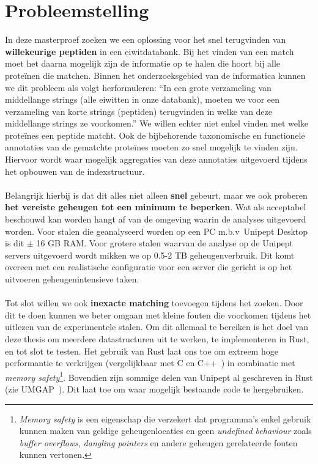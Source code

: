 \section{Probleemstelling}\label{sec:probleemstelling}
In deze masterproef zoeken we een oplossing voor het snel terugvinden van \textbf{willekeurige peptiden} in een eiwitdatabank.
Bij het vinden van een match moet het daarna mogelijk zijn de informatie op te halen die hoort bij alle proteïnen die matchen.
Binnen het onderzoeksgebied van de informatica kunnen we dit probleem als volgt herformuleren:
``In een grote verzameling van middellange strings (alle eiwitten in onze databank), moeten we voor een verzameling van korte strings (peptiden) terugvinden in welke van deze middellange strings ze voorkomen.''
We willen echter niet enkel vinden met welke proteïnes een peptide matcht.
Ook de bijbehorende taxonomische en functionele annotaties van de gematchte proteïnes moeten zo snel mogelijk te vinden zijn.
Hiervoor wordt waar mogelijk aggregaties van deze annotaties uitgevoerd tijdens het opbouwen van de indexstructuur.
\\ \\
Belangrijk hierbij is dat dit alles niet alleen \textbf{snel} gebeurt, maar we ook proberen \textbf{het vereiste geheugen tot een minimum te beperken}.
Wat als acceptabel beschouwd kan worden hangt af van de omgeving waarin de analyses uitgevoerd worden.
Voor stalen die geanalyseerd worden op een PC m.b.v~Unipept Desktop is dit $\pm$ 16 GB RAM\@.
Voor grotere stalen waarvan de analyse op de Unipept servers uitgevoerd wordt mikken we op 0.5-2 TB geheugenverbruik.
Dit komt overeen met een realistische configuratie voor een server die gericht is op het uitvoeren geheugenintensieve taken.
\\ \\
Tot slot willen we ook \textbf{inexacte matching} toevoegen tijdens het zoeken.
Door dit te doen kunnen we beter omgaan met kleine fouten die voorkomen tijdens het uitlezen van de experimentele stalen.
Om dit allemaal te bereiken is het doel van deze thesis om meerdere datastructuren uit te werken, te implementeren in Rust, en tot slot te testen.
Het gebruik van Rust laat ons toe om extreem hoge performantie te verkrijgen (vergelijkbaar met C en C++~\cite{rustPerformantie}) in combinatie met \textit{memory safety}\footnote{\textit{Memory safety} is een eigenschap die verzekert dat programma's enkel gebruik kunnen maken van geldige geheugenlocaties en geen \textit{undefined behaviour} zoals \textit{buffer overflows}, \textit{dangling pointers} en andere geheugen gerelateerde fouten kunnen vertonen.}.
Bovendien zijn sommige delen van Unipept al geschreven in Rust (zie UMGAP~\cite{UMGAP_paper, UMGAP_source}).
Dit laat toe om waar mogelijk bestaande code te hergebruiken.

